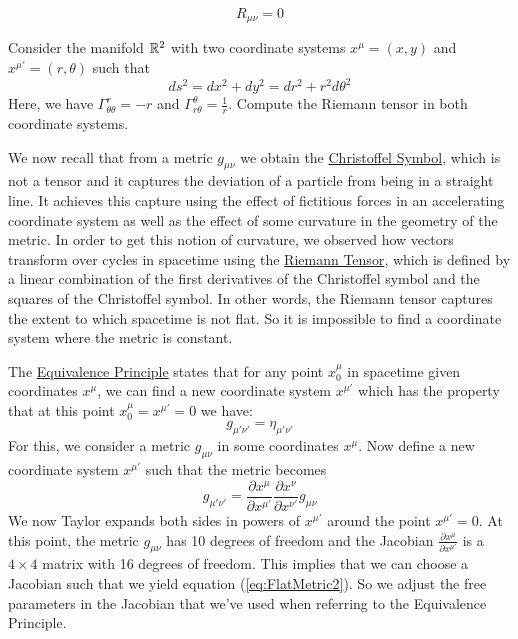 \documentclass{article}
\begin{document}
 		\begin{equation}
 			\label{eq:EinsteinEquation0}
 			\boxed{R_{\mu\nu} = 0}
 		\end{equation}
 		\begin{exe}
 			Consider the manifold $\mathbb{R}^2$ with two coordinate systems $x^\mu = (x,y)$ and $x^{\mu'} = (r,\theta)$ such that
 			$$ ds^2 = dx^2 + dy^2 = dr^2 + r^2 d\theta^2$$
 			Here, we have $\Gamma_{\theta\theta}^r = -r$ and $\Gamma_{r\theta}^\theta = \frac{1}{r}$. Compute the Riemann tensor in both coordinate systems.
 		\end{exe}
 		We now recall that from a metric $g_{\mu\nu}$ we obtain the \hyperref[eq:ChristoffelSymbol]{Christoffel Symbol}, which is not a tensor and it captures the deviation of a particle from being in a straight line. It achieves this capture using the effect of fictitious forces in an accelerating coordinate system as well as the effect of some curvature in the geometry of the metric. In order to get this notion of curvature, we observed how vectors transform over cycles in spacetime using the \hyperref[eq:RiemannTensor]{Riemann Tensor}, which is defined by a linear combination of the first derivatives of the Christoffel symbol and the squares of the Christoffel symbol. In other words, the Riemann tensor captures the extent to which spacetime is not flat. So it is impossible to find a coordinate system where the metric is constant.
 		
 		The \hyperref[defn:StrongEquivalence]{Equivalence Principle} states that for any point $x_0^\mu$ in spacetime given coordinates $x^\mu$, we can find a new coordinate system $x^{\mu'}$ which has the property that at this point $x_0^\mu = x^{\mu'} = 0$ we have:
 		\begin{equation}
 			\label{eq:FlatMetric2}
 			g_{\mu'\nu'} = \eta_{\mu' \nu'}
 		\end{equation}
 		For this, we consider a metric $g_{\mu\nu}$ in some coordinates $x^\mu$. Now define a new coordinate system $x^{\mu'}$ such that the metric 
 		becomes
 		\begin{equation}
 			\label{eq:MetricTransform}
 			\boxed{g_{\mu'\nu'} = \frac{\partial x^\mu}{\partial x^{\mu'}} \frac{\partial x^\nu}{\partial x^{\nu'}} g_{\mu\nu}}
 		\end{equation} 
 		We now Taylor expands both sides in powers of $x^{\mu'}$ around the point $x^{\mu'} = 0$. At this point, the metric $g_{\mu\nu}$ has 10 degrees of freedom and the Jacobian $\frac{\partial x^{\mu}}{\partial x^{\mu'}}$ is a $4\times 4$ matrix with 16 degrees of freedom. This implies that we can choose a Jacobian such that we yield equation (\ref{eq:FlatMetric2}). So we adjust the free parameters in the Jacobian that we've used when referring to the Equivalence Principle.
 		
\end{document}
